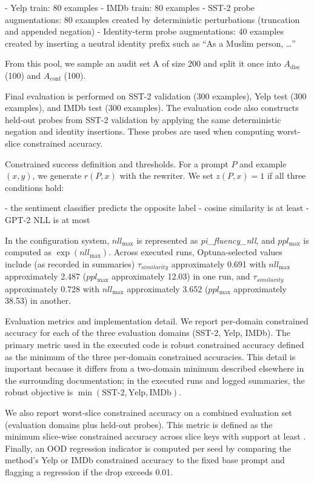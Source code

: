 \documentclass{article} %
\begin{document}
- Yelp train: 80 examples
- IMDb train: 80 examples
- SST-2 probe augmentations: 80 examples created by deterministic perturbations (truncation and appended negation)
- Identity-term probe augmentations: 40 examples created by inserting a neutral identity prefix such as ``As a Muslim person, \ldots''

From this pool, we sample an audit set A of size 200 and split it once into $A_{\text{disc}}$ (100) and $A_{\text{conf}}$ (100).

Final evaluation is performed on SST-2 validation (300 examples), Yelp test (300 examples), and IMDb test (300 examples). The evaluation code also constructs held-out probes from SST-2 validation by applying the same deterministic negation and identity insertions. These probes are used when computing worst-slice constrained accuracy.

Constrained success definition and thresholds. For a prompt $P$ and example $(x, y)$, we generate $r(P, x)$ with the rewriter. We set $z(P, x) = 1$ if all three conditions hold:

- the sentiment classifier predicts the opposite label
- cosine similarity is at least 
- GPT-2 NLL is at most 

In the configuration system, $nll_{\max}$ is represented as \textit{pi\_fluency\_nll}, and $ppl_{\max}$ is computed as $\exp(nll_{\max})$. Across executed runs, Optuna-selected values include (as recorded in summaries) $\tau_{\textit{similarity}}$ approximately 0.691 with $nll_{\max}$ approximately 2.487 ($ppl_{\max}$ approximately 12.03) in one run, and $\tau_{\textit{similarity}}$ approximately 0.728 with $nll_{\max}$ approximately 3.652 ($ppl_{\max}$ approximately 38.53) in another.

Evaluation metrics and implementation detail. We report per-domain constrained accuracy for each of the three evaluation domains (SST-2, Yelp, IMDb). The primary metric used in the executed code is robust constrained accuracy defined as the minimum of the three per-domain constrained accuracies. This detail is important because it differs from a two-domain minimum described elsewhere in the surrounding documentation; in the executed runs and logged summaries, the robust objective is $\min(\text{SST-2}, \text{Yelp}, \text{IMDb})$.

We also report worst-slice constrained accuracy on a combined evaluation set (evaluation domains plus held-out probes). This metric is defined as the minimum slice-wise constrained accuracy across slice keys with support at least . Finally, an OOD regression indicator is computed per seed by comparing the method’s Yelp or IMDb constrained accuracy to the fixed base prompt and flagging a regression if the drop exceeds 0.01.
\end{document}
